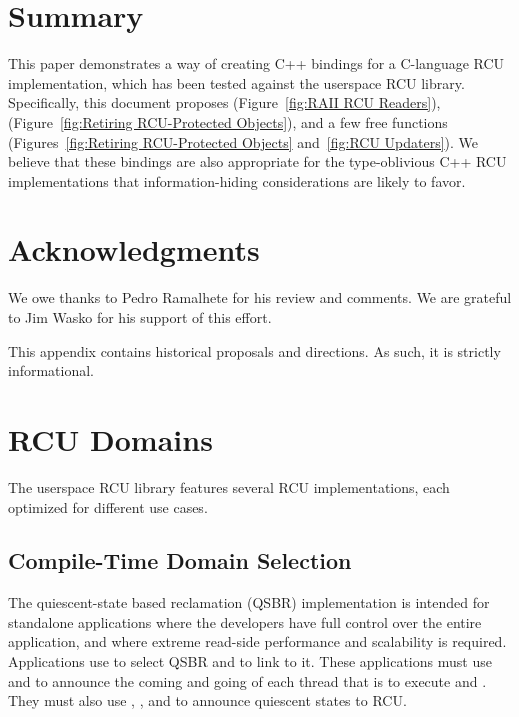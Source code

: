 \documentclass[letterpaper,10pt]{article}
\begin{document}
\section{Summary}
\label{sec:Summary}

This paper demonstrates a way of creating C++ bindings for a C-language
RCU implementation, which has been tested against the userspace RCU
library.
Specifically, this document proposes
 (Figure~\ref{fig:RAII RCU Readers}),
 (Figure~\ref{fig:Retiring RCU-Protected Objects}), and
a few free functions (Figures~\ref{fig:Retiring RCU-Protected Objects}
and~\ref{fig:RCU Updaters}).
We believe that these bindings are also appropriate for the type-oblivious
C++ RCU implementations that information-hiding considerations are likely
to favor.

\section*{Acknowledgments}

We owe thanks to Pedro Ramalhete for his review and comments.
We are grateful to Jim Wasko for his support of this effort.

%
%

\appendix
\clearpage

This appendix contains historical proposals and directions.
As such, it is strictly informational.

\section{RCU Domains}
\label{sec:RCU Domains}

The userspace RCU library features several RCU implementations, each
optimized for different use cases.

\subsection{Compile-Time Domain Selection}
\label{sec:Compile-Time Domain Selection}

The quiescent-state based reclamation (QSBR) implementation is intended
for standalone applications where the developers have full control
over the entire application, and where extreme read-side performance
and scalability is required.
Applications use  to select QSBR and
 to link to it.
These applications must use  and
 to announce the coming and going
of each thread that is to execute  and
.
They must also use , ,
and  to announce quiescent states to RCU.
\end{document}
